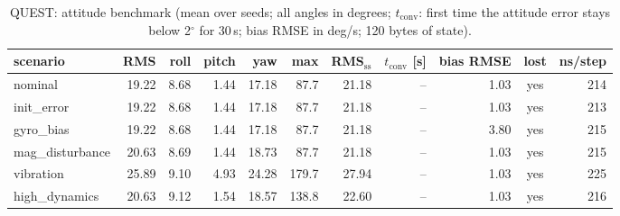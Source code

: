 \begin{table}[H]\centering\footnotesize\setlength{\tabcolsep}{3.5pt}\caption{QUEST: attitude benchmark (mean over seeds; all angles in degrees; $t_\mathrm{conv}$: first time the attitude error stays below 2$^\circ$ for 30\,s; bias RMSE in deg/s; 120 bytes of state).}\label{tab:imu_QUEST}
\begin{tabular}{lrrrrrrrrcr}\toprule scenario & RMS & roll & pitch & yaw & max & RMS$_\mathrm{ss}$ & $t_\mathrm{conv}$ [s] & bias RMSE & lost & ns/step \\ \midrule
nominal & 19.22 & 8.68 & 1.44 & 17.18 & 87.7 & 21.18 & -- & 1.03 & yes & 214 \\
init\_error & 19.22 & 8.68 & 1.44 & 17.18 & 87.7 & 21.18 & -- & 1.03 & yes & 213 \\
gyro\_bias & 19.22 & 8.68 & 1.44 & 17.18 & 87.7 & 21.18 & -- & 3.80 & yes & 215 \\
mag\_disturbance & 20.63 & 8.69 & 1.44 & 18.73 & 87.7 & 21.18 & -- & 1.03 & yes & 215 \\
vibration & 25.89 & 9.10 & 4.93 & 24.28 & 179.7 & 27.94 & -- & 1.03 & yes & 225 \\
high\_dynamics & 20.63 & 9.12 & 1.54 & 18.57 & 138.8 & 22.60 & -- & 1.03 & yes & 216 \\
\bottomrule\end{tabular}\end{table}
